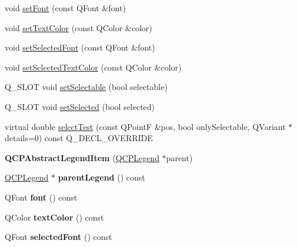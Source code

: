 \begin{DoxyCompactItemize}
\item 
void \hyperlink{class_q_c_p_abstract_legend_item_a409c53455d8112f71d70c0c43eb10265}{set\+Font} (const Q\+Font \&font)
\item 
void \hyperlink{class_q_c_p_abstract_legend_item_a6ebace6aaffaedcdab2d74e88acc2d1e}{set\+Text\+Color} (const Q\+Color \&color)
\item 
void \hyperlink{class_q_c_p_abstract_legend_item_a91db5aee48617a9d3206e61376807365}{set\+Selected\+Font} (const Q\+Font \&font)
\item 
void \hyperlink{class_q_c_p_abstract_legend_item_a4d01d008ee1a5bfe9905b0397a421936}{set\+Selected\+Text\+Color} (const Q\+Color \&color)
\item 
Q\+\_\+\+S\+L\+OT void \hyperlink{class_q_c_p_abstract_legend_item_a9913ef48730551b696e7f98a2391c599}{set\+Selectable} (bool selectable)
\item 
Q\+\_\+\+S\+L\+OT void \hyperlink{class_q_c_p_abstract_legend_item_a6eed93b0ab99cb3eabb043fb08179c2b}{set\+Selected} (bool selected)
\item 
virtual double \hyperlink{class_q_c_p_abstract_legend_item_a80ec112a6608fc39dbed56239849b187}{select\+Test} (const Q\+PointF \&pos, bool only\+Selectable, Q\+Variant $\ast$details=0) const Q\+\_\+\+D\+E\+C\+L\+\_\+\+O\+V\+E\+R\+R\+I\+DE
\item 
{\bfseries Q\+C\+P\+Abstract\+Legend\+Item} (\hyperlink{class_q_c_p_legend}{Q\+C\+P\+Legend} $\ast$parent)\hypertarget{class_q_c_p_abstract_legend_item_afaff87610e8da0fa238ecf552872d774}{}\label{class_q_c_p_abstract_legend_item_afaff87610e8da0fa238ecf552872d774}

\item 
\hyperlink{class_q_c_p_legend}{Q\+C\+P\+Legend} $\ast$ {\bfseries parent\+Legend} () const \hypertarget{class_q_c_p_abstract_legend_item_afcd683e43058f99a47d6546eedffc5c1}{}\label{class_q_c_p_abstract_legend_item_afcd683e43058f99a47d6546eedffc5c1}

\item 
Q\+Font {\bfseries font} () const \hypertarget{class_q_c_p_abstract_legend_item_ae476404706638d84fadc01021df2b19e}{}\label{class_q_c_p_abstract_legend_item_ae476404706638d84fadc01021df2b19e}

\item 
Q\+Color {\bfseries text\+Color} () const \hypertarget{class_q_c_p_abstract_legend_item_a444caef8565ac8d8653269f14d82b42d}{}\label{class_q_c_p_abstract_legend_item_a444caef8565ac8d8653269f14d82b42d}

\item 
Q\+Font {\bfseries selected\+Font} () const \hypertarget{class_q_c_p_abstract_legend_item_afccfe665eb8483cec924a9c0a53ddf2b}{}\label{class_q_c_p_abstract_legend_item_afccfe665eb8483cec924a9c0a53ddf2b}


\end{DoxyCompactItemize}
